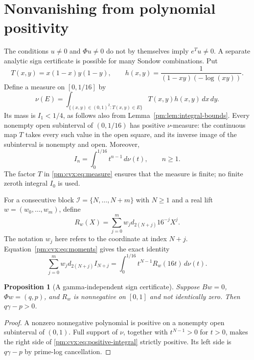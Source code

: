 \documentclass[11pt,a4paper]{article}
\newtheorem{proposition}[theorem]{Proposition}
\theoremstyle{definition}
\theoremstyle{remark}
\numberwithin{equation}{section}
\begin{document}
\section{Nonvanishing from polynomial positivity}
\label{pm:cvx:sec:positivity}

The conditions $u\ne0$ and $\Phi u\ne0$ do not by themselves imply
$e^Tu\ne0$.  A separate analytic sign certificate is possible for
many Sondow combinations.  Put
\[
 T(x,y)=x(1-x)y(1-y),\qquad
 h(x,y)=\frac{1}{(1-xy)(-\log(xy))}.
\]
Define a measure on $[0,1/16]$ by
\begin{equation}\label{pm:cvx:eq:measure}
 \nu(E)=\int_{\{(x,y)\in(0,1)^2:T(x,y)\in E\}}
                  T(x,y)h(x,y)\,dx\,dy.
\end{equation}
Its mass is $I_1<1/4$, as follows also from
Lemma~\ref{pm:lem:integral-bounds}.  Every nonempty open
subinterval of $(0,1/16)$ has positive $\nu$-measure: the continuous
map $T$ takes every such value in the open square, and its inverse
image of the subinterval is nonempty and open.  Moreover,
\begin{equation}\label{pm:cvx:eq:moments}
 I_n=\int_0^{1/16}t^{n-1}\,d\nu(t),\qquad n\ge1.
\end{equation}
The factor $T$ in \eqref{pm:cvx:eq:measure} ensures that the measure is
finite; no finite zeroth integral $I_0$ is used.

For a consecutive block $\mathcal I=\{N,\ldots,N+m\}$ with $N\ge1$
and a real lift $w=(w_0,\ldots,w_m)$, define
\begin{equation}\label{pm:cvx:eq:Rw}
 R_w(X)=\sum_{j=0}^m w_jd_{2(N+j)}16^{-j}X^j.
\end{equation}
The notation $w_j$ here refers to the coordinate at index $N+j$.
Equation~\eqref{pm:cvx:eq:moments} gives the exact identity
\begin{equation}\label{pm:cvx:eq:positive-integral}
 \sum_{j=0}^m w_jd_{2(N+j)}I_{N+j}
 =\int_0^{1/16}t^{N-1}R_w(16t)\,d\nu(t).
\end{equation}

\begin{proposition}[A gamma-independent sign certificate]
\label{pm:cvx:prop:polynomial-sign}
Suppose $Bw=0$, $\Phi w=(q,p)$, and $R_w$ is nonnegative on
$[0,1]$ and not identically zero.  Then $q\gamma-p>0$.
\end{proposition}
\begin{proof}
A nonzero nonnegative polynomial is positive on a nonempty open
subinterval of $(0,1)$.  Full support of $\nu$, together with
$t^{N-1}>0$ for $t>0$, makes the right side of
\eqref{pm:cvx:eq:positive-integral} strictly positive.  Its left side is
$q\gamma-p$ by prime-log cancellation.
\end{proof}
\end{document}
